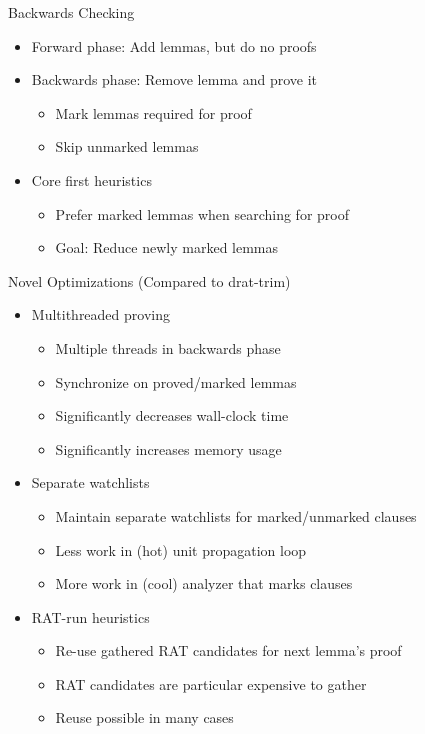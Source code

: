 \documentclass[fleqn]{beamer}
\begin{document}
\begin{frame}{Backwards Checking}
  \begin{itemize}
   \item Forward phase: Add lemmas, but do no proofs
   \item Backwards phase: Remove lemma and prove it
    \begin{itemize}
     \item Mark lemmas required for proof
     \item Skip unmarked lemmas
    \end{itemize}
   \item Core first heuristics
    \begin{itemize}
     \item Prefer marked lemmas when searching for proof
     \item Goal: Reduce newly marked lemmas
  
    \end{itemize}
  \end{itemize}
\end{frame}
\begin{frame}{Novel Optimizations (Compared to drat-trim)}
  \begin{itemize}
   \item Multithreaded proving
    \begin{itemize}
     \item Multiple threads in backwards phase
     \item Synchronize on proved/marked lemmas
     \item Significantly decreases wall-clock time
     \item Significantly increases memory usage
    \end{itemize}
   \item Separate watchlists
    \begin{itemize}
     \item Maintain separate watchlists for marked/unmarked clauses
     \item Less work in (hot) unit propagation loop
     \item More work in (cool) analyzer that marks clauses
    \end{itemize}
   \item RAT-run heuristics
    \begin{itemize}
     \item Re-use gathered RAT candidates for next lemma's proof
     \item RAT candidates are particular expensive to gather
     \item Reuse possible in many cases

%   
    
    
    \end{itemize}
  \end{itemize}
\end{frame}
\newcommand{\annot}[1]{{\footnotesize\color{red}{#1}}}
\end{document}
